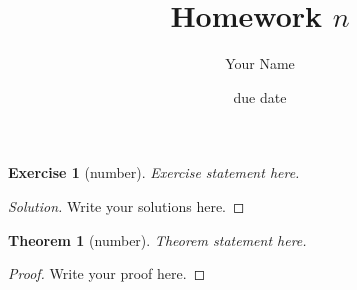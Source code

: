\documentclass{article}
\title{Homework $n$}
\author{Your Name}
\date{due date}
\newtheorem*{thm}{Theorem}
\newtheorem*{ex}{Exercise}
\newenvironment{solution}
  {\begin{proof}[Solution]}
  {\renewcommand{\qedsymbol}{}\end{proof}}
\begin{document}
\maketitle

\begin{ex}[number]
    Exercise statement here.
\end{ex}
\begin{solution}
    Write your solutions here.
\end{solution}

\begin{thm}[number]
    Theorem statement here.
\end{thm}

\begin{proof}
    Write your proof here.
\end{proof}
\end{document}

